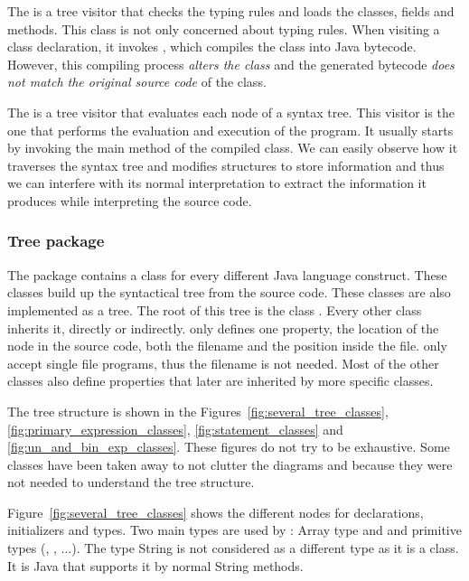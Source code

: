 The  is a tree visitor that checks the typing rules and loads the
classes, fields and methods. This  class is not only concerned
about typing rules. When visiting a class declaration, it invokes
, which compiles the class into Java bytecode. However, this
compiling process \textit{alters the class} and the generated bytecode \textit{does
not match the original source code} of the class.

The  is a tree visitor that evaluates each node of
a syntax tree. This visitor is the one that performs the evaluation and
execution of the program. It usually starts by invoking the main method
of the compiled class. We can easily observe how it traverses
the syntax tree and modifies \djava{} structures to store information
and thus we can interfere with its normal interpretation to extract
the information it produces while interpreting the source code.

\subsubsection{Tree package}
\label{sec:Tree_package}

The  package contains a class for every different Java
language construct. These classes build up the syntactical tree
from the source code. These classes are also implemented as a
tree. The root of this tree is the class . Every other class
inherits it, directly or indirectly.  only defines one
property, the location of the node in the source code, both the
filename and the position inside the file. \jel{} only accept
single file programs, thus the filename is not needed. Most of the
other classes also define properties that later are inherited by
more specific classes.

The tree structure is shown in the
Figures~\ref{fig:several_tree_classes},
\ref{fig:primary_expression_classes}, \ref{fig:statement_classes}
and \ref{fig:un_and_bin_exp_classes}. These figures do not try to
be exhaustive. Some classes have been taken away to not clutter
the diagrams and because they were not needed to understand the
tree structure.

Figure~\ref{fig:several_tree_classes} shows the different nodes
for declarations, initializers and types. Two main types are used
by \djava{}: Array type and and primitive types (,
, ...). The type String is not considered as a different type as
it is a class. It is Java that supports it by normal String
methods.

